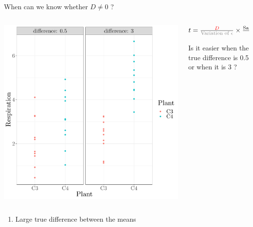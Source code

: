\documentclass[10pt]{beamer}
\begin{document}
\begin{frame}{When can we know whether $D \neq 0$ ?}

 \begin{columns}
 \begin{column}{0.5\textwidth}
 \includegraphics[width=\textwidth]{Figures/figure/ttestdiff-1}
 \end{column}
 \begin{column}{0.5\textwidth}
  $ t = \frac{\color{red}{D}}{\text{\color{gray}{Variation of }}\color{gray}{\epsilon}} \times \frac{\text{Sample Size}}{\sqrt{2}}$

  \vspace{1cm}
  Is it easier when the true difference is 0.5 or when it is 3 ?
 \end{column}
 \end{columns}
 
 \pause
 \begin{alertblock}{}
  \begin{enumerate}
   \item Large true difference between the means
  \end{enumerate}
 \end{alertblock}

\end{frame}
\end{document}
